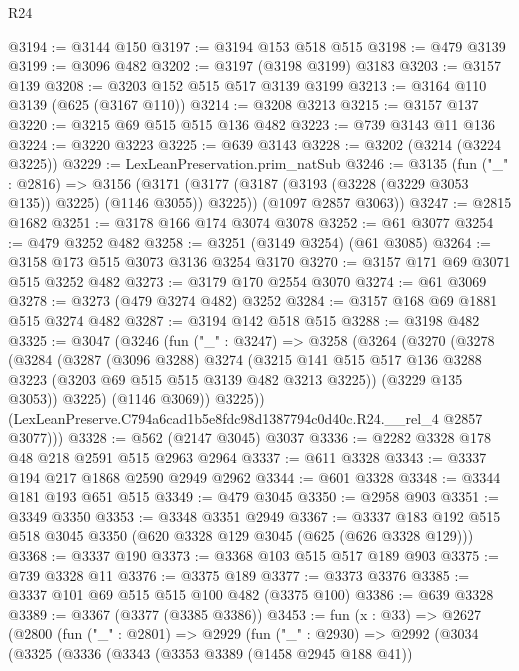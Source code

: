 \begin{lexlean}{R24}
\begin{coremodule}
@3194 := @3144 @150
@3197 := @3194 @153 @518 @515
@3198 := @479 @3139
@3199 := @3096 @482
@3202 := @3197 (@3198 @3199) @3183
@3203 := @3157 @139
@3208 := @3203 @152 @515 @517 @3139 @3199
@3213 := @3164 @110 @3139 (@625 (@3167 @110))
@3214 := @3208 @3213
@3215 := @3157 @137
@3220 := @3215 @69 @515 @515 @136 @482
@3223 := @739 @3143 @11 @136
@3224 := @3220 @3223
@3225 := @639 @3143
@3228 := @3202 (@3214 (@3224 @3225))
@3229 := LexLeanPreservation.prim_natSub
@3246 := @3135
    (fun ("_" : @2816) =>
    @3156
      (@3171 (@3177 (@3187 (@3193 (@3228 (@3229 @3053 @135)) @3225) (@1146 @3055)) @3225))
      (@1097 @2857 @3063))
@3247 := @2815 @1682
@3251 := @3178 @166 @174 @3074 @3078
@3252 := @61 @3077
@3254 := @479 @3252 @482
@3258 := @3251 (@3149 @3254) (@61 @3085)
@3264 := @3158 @173 @515 @3073 @3136 @3254 @3170
@3270 := @3157 @171 @69 @3071 @515 @3252 @482
@3273 := @3179 @170 @2554 @3070
@3274 := @61 @3069
@3278 := @3273 (@479 @3274 @482) @3252
@3284 := @3157 @168 @69 @1881 @515 @3274 @482
@3287 := @3194 @142 @518 @515
@3288 := @3198 @482
@3325 := @3047
    (@3246
      (fun ("_" : @3247) =>
      @3258
        (@3264
          (@3270
            (@3278
              (@3284
                (@3287
                  (@3096 @3288)
                  @3274
                  (@3215
                    @141
                    @515
                    @517
                    @136
                    @3288
                    @3223
                    (@3203 @69 @515 @515 @3139 @482 @3213 @3225))
                  (@3229 @135 @3053))
                @3225)
              (@1146 @3069))
            @3225))
        (LexLeanPreserve.C794a6cad1b5e8fdc98d1387794c0d40c.R24.__rel_4 @2857 @3077)))
@3328 := @562 (@2147 @3045) @3037
@3336 := @2282 @3328 @178 @48 @218 @2591 @515 @2963 @2964
@3337 := @611 @3328
@3343 := @3337 @194 @217 @1868 @2590 @2949 @2962
@3344 := @601 @3328
@3348 := @3344 @181 @193 @651 @515
@3349 := @479 @3045
@3350 := @2958 @903
@3351 := @3349 @3350
@3353 := @3348 @3351 @2949
@3367 := @3337 @183 @192 @515 @518 @3045 @3350 (@620 @3328 @129 @3045 (@625 (@626 @3328 @129)))
@3368 := @3337 @190
@3373 := @3368 @103 @515 @517 @189 @903
@3375 := @739 @3328 @11
@3376 := @3375 @189
@3377 := @3373 @3376
@3385 := @3337 @101 @69 @515 @515 @100 @482 (@3375 @100)
@3386 := @639 @3328
@3389 := @3367 (@3377 (@3385 @3386))
@3453 := fun (x : @33) =>
  @2627
    (@2800
      (fun ("_" : @2801) =>
      @2929
        (fun ("_" : @2930) =>
        @2992
          (@3034
            (@3325
              (@3336
                (@3343
                  (@3353 @3389 (@1458 @2945 @188 @41))

\end{coremodule}
\end{lexlean}
